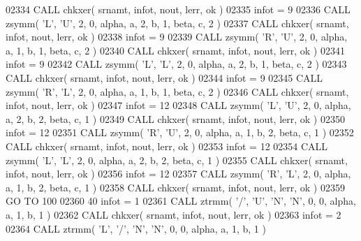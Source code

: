 \begin{DoxyCode}
02334       \textcolor{keyword}{CALL }chkxer( srnamt, infot, nout, lerr, ok )
02335       infot = 9
02336       \textcolor{keyword}{CALL }zsymm( \textcolor{stringliteral}{'L'}, \textcolor{stringliteral}{'U'}, 2, 0, alpha, a, 2, b, 1, beta, c, 2 )
02337       \textcolor{keyword}{CALL }chkxer( srnamt, infot, nout, lerr, ok )
02338       infot = 9
02339       \textcolor{keyword}{CALL }zsymm( \textcolor{stringliteral}{'R'}, \textcolor{stringliteral}{'U'}, 2, 0, alpha, a, 1, b, 1, beta, c, 2 )
02340       \textcolor{keyword}{CALL }chkxer( srnamt, infot, nout, lerr, ok )
02341       infot = 9
02342       \textcolor{keyword}{CALL }zsymm( \textcolor{stringliteral}{'L'}, \textcolor{stringliteral}{'L'}, 2, 0, alpha, a, 2, b, 1, beta, c, 2 )
02343       \textcolor{keyword}{CALL }chkxer( srnamt, infot, nout, lerr, ok )
02344       infot = 9
02345       \textcolor{keyword}{CALL }zsymm( \textcolor{stringliteral}{'R'}, \textcolor{stringliteral}{'L'}, 2, 0, alpha, a, 1, b, 1, beta, c, 2 )
02346       \textcolor{keyword}{CALL }chkxer( srnamt, infot, nout, lerr, ok )
02347       infot = 12
02348       \textcolor{keyword}{CALL }zsymm( \textcolor{stringliteral}{'L'}, \textcolor{stringliteral}{'U'}, 2, 0, alpha, a, 2, b, 2, beta, c, 1 )
02349       \textcolor{keyword}{CALL }chkxer( srnamt, infot, nout, lerr, ok )
02350       infot = 12
02351       \textcolor{keyword}{CALL }zsymm( \textcolor{stringliteral}{'R'}, \textcolor{stringliteral}{'U'}, 2, 0, alpha, a, 1, b, 2, beta, c, 1 )
02352       \textcolor{keyword}{CALL }chkxer( srnamt, infot, nout, lerr, ok )
02353       infot = 12
02354       \textcolor{keyword}{CALL }zsymm( \textcolor{stringliteral}{'L'}, \textcolor{stringliteral}{'L'}, 2, 0, alpha, a, 2, b, 2, beta, c, 1 )
02355       \textcolor{keyword}{CALL }chkxer( srnamt, infot, nout, lerr, ok )
02356       infot = 12
02357       \textcolor{keyword}{CALL }zsymm( \textcolor{stringliteral}{'R'}, \textcolor{stringliteral}{'L'}, 2, 0, alpha, a, 1, b, 2, beta, c, 1 )
02358       \textcolor{keyword}{CALL }chkxer( srnamt, infot, nout, lerr, ok )
02359       \textcolor{keywordflow}{GO TO} 100
02360    40 infot = 1
02361       \textcolor{keyword}{CALL }ztrmm( \textcolor{stringliteral}{'/'}, \textcolor{stringliteral}{'U'}, \textcolor{stringliteral}{'N'}, \textcolor{stringliteral}{'N'}, 0, 0, alpha, a, 1, b, 1 )
02362       \textcolor{keyword}{CALL }chkxer( srnamt, infot, nout, lerr, ok )
02363       infot = 2
02364       \textcolor{keyword}{CALL }ztrmm( \textcolor{stringliteral}{'L'}, \textcolor{stringliteral}{'/'}, \textcolor{stringliteral}{'N'}, \textcolor{stringliteral}{'N'}, 0, 0, alpha, a, 1, b, 1 )

\end{DoxyCode}
